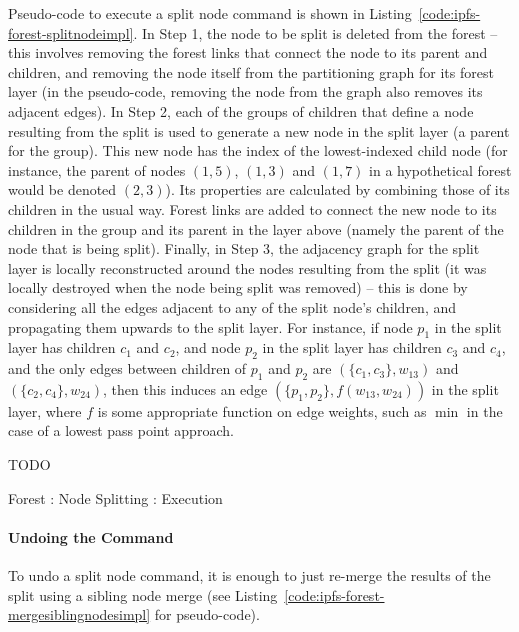 Pseudo-code to execute a split node command is shown in Listing~\ref{code:ipfs-forest-splitnodeimpl}. In Step 1, the node to be split is deleted from the forest -- this involves removing the forest links that connect the node to its parent and children, and removing the node itself from the partitioning graph for its forest layer (in the pseudo-code, removing the node from the graph also removes its adjacent edges). In Step 2, each of the groups of children that define a node resulting from the split is used to generate a new node in the split layer (a parent for the group). This new node has the index of the lowest-indexed child node (for instance, the parent of nodes $(1,5)$, $(1,3)$ and $(1,7)$ in a hypothetical forest would be denoted $(2,3)$). Its properties are calculated by combining those of its children in the usual way. Forest links are added to connect the new node to its children in the group and its parent in the layer above (namely the parent of the node that is being split). Finally, in Step 3, the adjacency graph for the split layer is locally reconstructed around the nodes resulting from the split (it was locally destroyed when the node being split was removed) -- this is done by considering all the edges adjacent to any of the split node's children, and propagating them upwards to the split layer. For instance, if node $p_1$ in the split layer has children $c_1$ and $c_2$, and node $p_2$ in the split layer has children $c_3$ and $c_4$, and the only edges between children of $p_1$ and $p_2$ are $(\{c_1,c_3\}, w_{13})$ and $(\{c_2,c_4\}, w_{24})$, then this induces an edge $(\{p_1,p_2\}, f(w_{13}, w_{24}))$ in the split layer, where $f$ is some appropriate function on edge weights, such as $\min$ in the case of a lowest pass point approach.

TODO

\begin{stulisting}[p]
\caption{Forest : Node Splitting : Execution}
\label{code:ipfs-forest-splitnodeimpl}

\end{stulisting}

\paragraph{Undoing the Command}

To undo a split node command, it is enough to just re-merge the results of the split using a sibling node merge (see Listing~\ref{code:ipfs-forest-mergesiblingnodesimpl} for pseudo-code).

